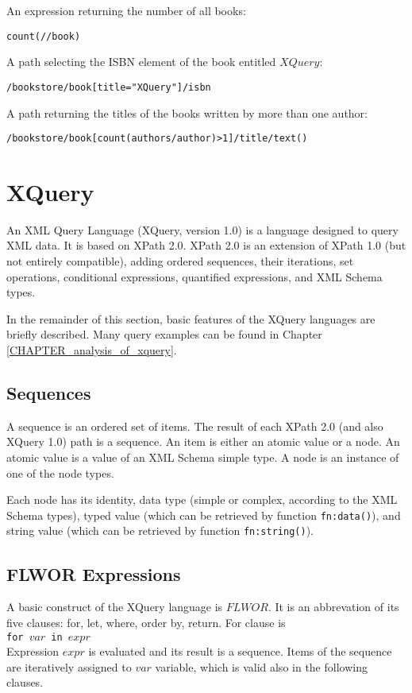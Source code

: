An expression returning the number of all books:
\begin{alltt}
count(//book)
\end{alltt}

A path selecting the ISBN element of the book entitled $XQuery$:
\begin{alltt}
/bookstore/book[title = "XQuery"]/isbn
\end{alltt}

A path returning the titles of the books written by more than one author:
\begin{alltt}
/bookstore/book[count(authors/author) > 1]/title/text()
\end{alltt}

\section{XQuery}
An XML Query Language (XQuery, version 1.0) \cite{w3c_xquery} is a language designed to query XML data. It is based on XPath 2.0. XPath 2.0 is an extension of XPath 1.0 (but not entirely compatible), adding ordered sequences, their iterations, set operations, conditional expressions, quantified expressions, and XML Schema types.

In the remainder of this section, basic features of the XQuery languages are briefly described. Many query examples can be found in Chapter \ref{CHAPTER_analysis_of_xquery}.

\subsection{Sequences}
A sequence is an ordered set of items. The result of each XPath 2.0 (and also XQuery 1.0) path is a sequence. An item is either an atomic value or a node. An atomic value is a value of an XML Schema simple type. A node is an instance of one of the node types.

Each node has its identity, data type (simple or complex, according to the XML Schema types), typed value (which can be retrieved by function \texttt{fn:data()}), and string value (which can be retrieved by function \texttt{fn:string()}).

\subsection{FLWOR Expressions}
A basic construct of the XQuery language is $FLWOR$. It is an abbrevation of its five clauses: for, let, where, order by, return. For clause is \\
\texttt{for $var$ in $expr$} \\
Expression $expr$ is evaluated and its result is a sequence. Items of the sequence are iteratively assigned to $var$ variable, which is valid also in the following clauses.


